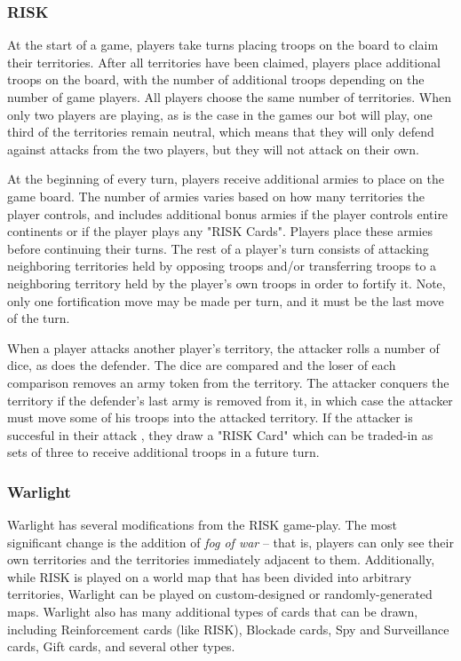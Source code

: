 \documentclass[a4paper,11pt]{article}
\begin{document}
\subsubsection{RISK}
At the start of a game, players take turns placing troops on the board to claim
their territories.  After all territories have been claimed, players place
additional troops on the board, with the number of additional troops depending on
the number of game players.  All players choose the same number of territories.
When only two players are playing, as is the case in the games our bot will play,
one third of the territories remain neutral, which means that they will only defend
against attacks from the two players, but they will not attack on their own.

At the beginning of every turn, players receive additional armies to place on the 
game board.  The number of armies varies based on how many territories the player 
controls, and includes additional bonus armies if the player controls entire 
continents or if the player plays any "RISK Cards".  Players place these armies 
before continuing their turns.  The rest of a player's turn consists of attacking 
neighboring territories held by opposing troops and/or transferring troops to a 
neighboring territory held by the player's own troops in order to fortify it. 
Note, only one fortification move may be made per turn, and it must be the last 
move of the turn.

When a player attacks another player's territory, the attacker rolls a number of 
dice, as does the defender.  The dice are compared and the loser of each comparison 
removes an army token from the territory.  The attacker conquers the territory if 
the defender's last army is removed from it, in which case the attacker must move 
some of his troops into the attacked territory.  If the attacker is succesful in 
their attack , they draw a "RISK Card" which can be traded-in as sets of three 
to receive additional troops in a future turn.

\subsubsection{Warlight} \label{sec:warlight}
Warlight has several modifications from the RISK game-play.  The most significant 
change is the addition of \emph{fog of war} -- that is, players can only see 
their own territories and the territories immediately adjacent to them.  
Additionally, while RISK is played on a world map that has been divided into arbitrary 
territories, Warlight can be played on custom-designed or randomly-generated maps.  
Warlight also has many additional types of cards that can be drawn, including 
Reinforcement cards (like RISK), Blockade cards, Spy and Surveillance cards, 
Gift cards, and several other types.
\end{document}
